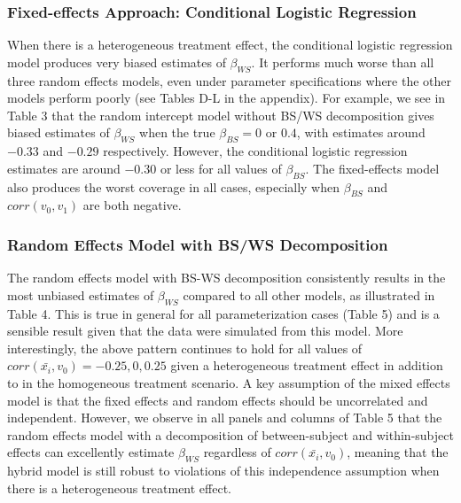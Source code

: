 \documentclass{article}
\begin{document}
        \subsubsection{Fixed-effects Approach: Conditional Logistic Regression}
        When there is a heterogeneous treatment effect, the conditional logistic regression model produces very biased estimates of $\beta_{WS}$. It performs much worse than all three random effects models, even under parameter specifications where the other models perform poorly (see Tables D-L in the appendix). For example, we see in Table 3 that the random intercept model without BS/WS decomposition gives biased estimates of $\beta_{WS}$ when the true $\beta_{BS} = 0$ or $0.4$, with estimates around $-0.33$ and $-0.29$ respectively. However, the conditional logistic regression estimates are around $-0.30$ or less for all values of $\beta_{BS}$. The fixed-effects model also produces the worst coverage in all cases, especially when $\beta_{BS}$ and $corr(v_0,v_1)$ are both negative. 

        \subsubsection{Random Effects Model with BS/WS Decomposition}
        The random effects model with BS-WS decomposition consistently results in the most unbiased estimates of $\beta_{WS}$ compared to all other models, as illustrated in Table 4. This is true in general for all parameterization cases (Table 5) and is a sensible result given that the data were simulated from this model. More interestingly, the above pattern continues to hold for all values of $corr(\bar{x_i},v_0) = -0.25, 0, 0.25$ given a heterogeneous treatment effect in addition to in the homogeneous treatment scenario. A key assumption of the mixed effects model is that the fixed effects and random effects should be uncorrelated and independent. However, we observe in all panels and columns of Table 5 that the random effects model with a decomposition of between-subject and within-subject effects can excellently estimate $\beta_{WS}$ regardless of $corr(\bar{x_i},v_0)$, meaning that the hybrid model is still robust to violations of this independence assumption when there is a heterogeneous treatment effect. 
    
\end{document}

